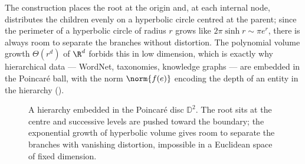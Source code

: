 The construction places the root at the origin and, at each internal node,
distributes the children evenly on a hyperbolic circle centred at the parent;
since the perimeter of a hyperbolic circle of radius $r$ grows like
$2\pi\sinh r \sim \pi e^r$, there is always room to separate the branches
without distortion. The polynomial volume growth $\Theta(r^d)$ of $\R^d$
forbids this in low dimension, which is exactly why hierarchical data ---
WordNet, taxonomies, knowledge graphs --- are embedded in the Poincar\'e ball,
with the norm $\norm{f(e)}$ encoding the depth of an entity in the hierarchy
().

\begin{figure}[h]
\centering
{}
\caption[Hyperbolic tree embedding]{A hierarchy embedded in the Poincar\'e disc
$\mathbb{D}^2$. The root sits at the centre and successive levels are pushed
toward the boundary; the exponential growth of hyperbolic volume gives room to
separate the branches with vanishing distortion, impossible in a Euclidean
space of fixed dimension.}
\label{fig:geo:hyperbolic}
\end{figure}

